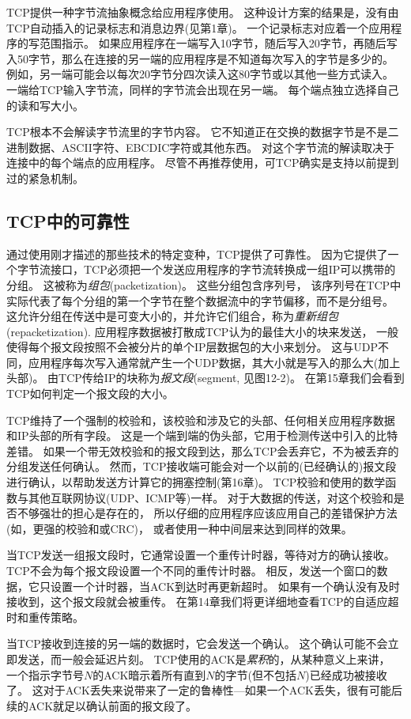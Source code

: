 \documentclass{../main.tex}{subfiles}
\begin{document}
TCP提供一种字节流抽象概念给应用程序使用。
这种设计方案的结果是，没有由TCP自动插入的记录标志和消息边界(见第1章)。
一个记录标志对应着一个应用程序的写范围指示。
如果应用程序在一端写入10字节，随后写入20字节，再随后写入50字节，那么在连接的另一端的应用程序是不知道每次写入的字节是多少的。
例如，另一端可能会以每次20字节分四次读入这80字节或以其他一些方式读入。
一端给TCP输入字节流，同样的字节流会出现在另一端。
每个端点独立选择自己的读和写大小。

TCP根本不会解读字节流里的字节内容。
它不知道正在交换的数据字节是不是二进制数据、ASCII字符、EBCDIC字符或其他东西。
对这个字节流的解读取决于连接中的每个端点的应用程序。
尽管不再推荐使用，可TCP确实是支持以前提到过的紧急机制。


\subsection{TCP中的可靠性}
通过使用刚才描述的那些技术的特定变种，TCP提供了可靠性。
因为它提供了一个字节流接口，TCP必须把一个发送应用程序的字节流转换成一组IP可以携带的分组。
这被称为\emph{组包}(packetization)。
这些分组包含序列号，
    该序列号在TCP中实际代表了每个分组的第一个字节在整个数据流中的字节偏移，而不是分组号。
这允许分组在传送中是可变大小的，并允许它们组合，称为\emph{重新组包}(repacketization).
应用程序数据被打散成TCP认为的最佳大小的块来发送，
    一般使得每个报文段按照不会被分片的单个IP层数据包的大小来划分。
这与UDP不同，应用程序每次写入通常就产生一个UDP数据，其大小就是写入的那么大(加上头部)。
由TCP传给IP的块称为\emph{报文段}(segment, 见图12-2)。
在第15章我们会看到TCP如何判定一个报文段的大小。

TCP维持了一个强制的校验和，该校验和涉及它的头部、任何相关应用程序数据和IP头部的所有字段。
这是一个端到端的伪头部，它用于检测传送中引入的比特差错。
如果一个带无效校验和的报文段到达，那么TCP会丢弃它，不为被丢弃的分组发送任何确认。
然而，TCP接收端可能会对一个以前的(已经确认的)报文段进行确认，以帮助发送方计算它的拥塞控制(第16章)。
TCP校验和使用的数学函数与其他互联网协议(UDP、ICMP等)一样。
对于大数据的传送，对这个校验和是否不够强壮的担心是存在的，
    所以仔细的应用程序应该应用自己的差错保护方法(如，更强的校验和或CRC)，
    或者使用一种中间层来达到同样的效果。

当TCP发送一组报文段时，它通常设置一个重传计时器，等待对方的确认接收。
TCP不会为每个报文段设置一个不同的重传计时器。
相反，发送一个窗口的数据，它只设置一个计时器，当ACK到达时再更新超时。
如果有一个确认没有及时接收到，这个报文段就会被重传。
在第14章我们将更详细地查看TCP的自适应超时和重传策略。

当TCP接收到连接的另一端的数据时，它会发送一个确认。
这个确认可能不会立即发送，而一般会延迟片刻。
TCP使用的ACK是\emph{累积}的，从某种意义上来讲，
    一个指示字节号$N$的ACK暗示着所有直到$N$的字节(但不包括$N$)已经成功被接收了。
这对于ACK丢失来说带来了一定的鲁棒性---如果一个ACK丢失，很有可能后续的ACK就足以确认前面的报文段了。
\end{document}
